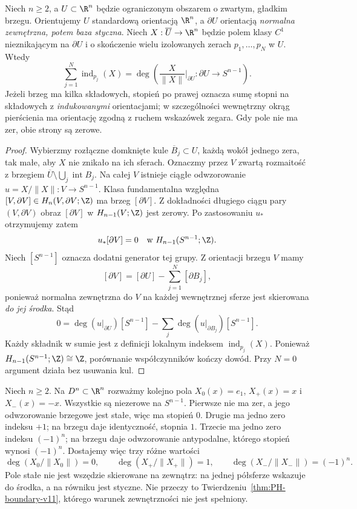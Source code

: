 \begin{twierdzenie}
\label{thm:PH-stopien-brzegowy-21}
Niech $n\ge2$, a $U\subset\R^n$ będzie ograniczonym
obszarem o zwartym, gładkim brzegu. Orientujemy $U$
standardową orientacją $\R^n$, a $\partial U$ orientacją
\emph{normalna zewnętrzna, potem baza styczna}.
Niech $X:\overline U\to\R^n$ będzie polem klasy $C^1$
nieznikającym na $\partial U$ i o skończenie wielu
izolowanych zerach $p_1,\ldots,p_N$ w $U$.
Wtedy
\[
 \sum_{j=1}^N\operatorname{ind}_{p_j}(X)
 =\deg\left(\frac{X}{\|X\|}\Big|_{\partial U}:
               \partial U\longrightarrow S^{n-1}\right).
\]
Jeżeli brzeg ma kilka składowych, stopień po prawej
oznacza sumę stopni na składowych z \emph{indukowanymi}
orientacjami; w szczególności wewnętrzny okrąg
pierścienia ma orientację zgodną z ruchem wskazówek zegara.
Gdy pole nie ma zer, obie strony są zerowe.
\end{twierdzenie}
\begin{proof}
Wybierzmy rozłączne domknięte kule
$\overline B_j\subset U$, każdą wokół jednego zera,
tak małe, aby $X$ nie znikało na ich sferach.
Oznaczmy przez $V$ zwartą rozmaitość z brzegiem
$\overline U\setminus\bigcup_j\operatorname{int} B_j$.
Na całej $V$ istnieje ciągłe odwzorowanie
$u=X/\|X\|:V\to S^{n-1}$.
Klasa fundamentalna względna
$[V,\partial V]\in H_n(V,\partial V;\Z)$
ma brzeg $[\partial V]$.
Z dokładności długiego ciągu pary $(V,\partial V)$
obraz $[\partial V]$ w $H_{n-1}(V;\Z)$ jest zerowy.
Po zastosowaniu $u_*$ otrzymujemy zatem
\[
 u_*[\partial V]=0\quad\text{w }H_{n-1}(S^{n-1};\Z).
\]
Niech $[S^{n-1}]$ oznacza dodatni generator
tej grupy. Z orientacji brzegu $V$ mamy
\[
 [\partial V]=[\partial U]
                 -\sum_{j=1}^N[\partial B_j],
\]
ponieważ normalna zewnętrzna do $V$ na każdej
wewnętrznej sferze jest skierowana \emph{do jej środka}.
Stąd
\[
 0=\deg(u|_{\partial U})[S^{n-1}]
      -\sum_j\deg(u|_{\partial B_j})[S^{n-1}].
\]
Każdy składnik w sumie jest z definicji
lokalnym indeksem $\operatorname{ind}_{p_j}(X)$.
Ponieważ $H_{n-1}(S^{n-1};\Z)\cong\Z$,
porównanie współczynników kończy dowód.
Przy $N=0$ argument działa bez usuwania kul.
\end{proof}

\begin{przyklad}
\label{prz:PH-stopien-dysk-trzy-pola-21}
Niech $n\ge2$. Na $D^n\subset\R^n$ rozważmy kolejno pola
$X_0(x)=e_1$, $X_+(x)=x$ i $X_-(x)=-x$.
Wszystkie są niezerowe na $S^{n-1}$.
Pierwsze nie ma zer, a jego odwzorowanie brzegowe
jest stałe, więc ma stopień $0$.
Drugie ma jedno zero indeksu $+1$;
na brzegu daje identyczność, stopnia $1$.
Trzecie ma jedno zero indeksu $(-1)^n$;
na brzegu daje odwzorowanie antypodalne,
którego stopień wynosi $(-1)^n$.
Dostajemy więc trzy różne wartości
\[
 \deg(X_0/\|X_0\|)=0,\qquad
 \deg(X_+/\|X_+\|)=1,\qquad
 \deg(X_-/\|X_-\|)=(-1)^n.
\]
Pole stałe nie jest wszędzie skierowane na zewnątrz:
na jednej półsferze wskazuje do środka,
a na równiku jest styczne.
Nie przeczy to Twierdzeniu~\ref{thm:PH-boundary-v11},
którego warunek zewnętrzności nie jest spełniony.
\end{przyklad}


